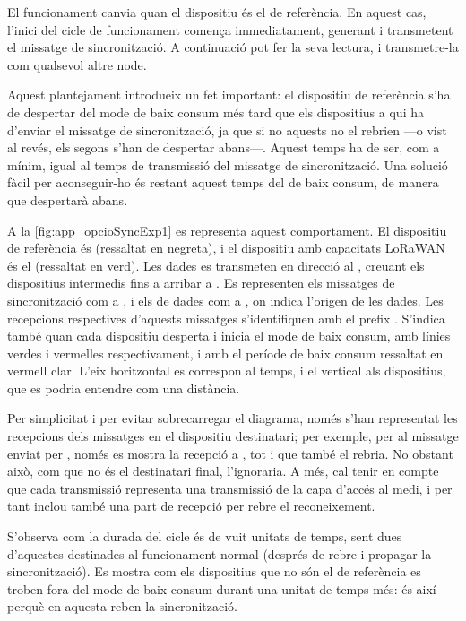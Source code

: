 \documentclass{tfgitic}[2024/07/01]
\begin{document}
{El funcionament canvia quan el dispositiu és el de referència. En aquest cas, l'inici del cicle de funcionament comença immediatament, generant i transmetent el missatge de sincronització. A continuació pot fer la seva lectura, i transmetre-la com qualsevol altre node.

Aquest plantejament introdueix un fet important: el dispositiu de referència s'ha de despertar del mode de baix consum més tard que els dispositius a qui ha d'enviar el missatge de sincronització, ja que si no aquests no el rebrien ---o vist al revés, els segons s’han de despertar abans---. Aquest temps ha de ser, com a mínim, igual al temps de transmissió del missatge de sincronització. Una solució fàcil per aconseguir-ho és restant aquest temps del de baix consum, de manera que despertarà abans. 

A la \autoref{fig:app_opcioSyncExp1} es representa aquest comportament. El dispositiu de referència és  (ressaltat en negreta), i el dispositiu amb capacitats LoRaWAN és el  (ressaltat en verd). Les dades es transmeten en direcció al , creuant els dispositius intermedis fins a arribar a . Es representen els missatges de sincronització com a , i els de dades com a , on  indica l'origen de les dades. Les recepcions respectives d'aquests missatges s'identifiquen amb el prefix . S'indica també quan cada dispositiu desperta i inicia el mode de baix consum, amb línies verdes i vermelles respectivament, i amb el període de baix consum ressaltat en vermell clar. L'eix horitzontal es correspon al temps, i el vertical als dispositius, que es podria entendre com una distància.

Per simplicitat i per evitar sobrecarregar el diagrama, només s'han representat les recepcions dels missatges en el dispositiu destinatari; per exemple, per al missatge  enviat per , només es mostra la recepció a , tot i que  també el rebria. No obstant això, com que no és el destinatari final, l'ignoraria. A més, cal tenir en compte que cada transmissió representa una transmissió de la capa d'accés al medi, i per tant inclou també una part de recepció per rebre el reconeixement.

S'observa com la durada del cicle és de vuit unitats de temps, sent dues d'aquestes destinades al funcionament normal (després de rebre i propagar la sincronització). Es mostra com els dispositius que no són el de referència es troben fora del mode de baix consum durant una unitat de temps més: és així perquè en aquesta reben la sincronització.

}
\end{document}
